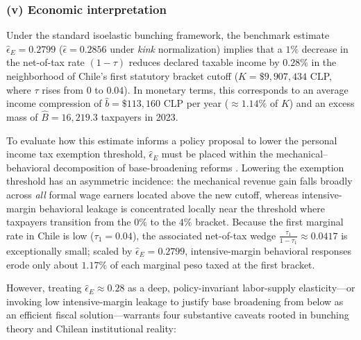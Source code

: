 \subsubsection*{(v) Economic interpretation}

Under the standard isoelastic bunching framework, the benchmark estimate $\hat{\epsilon}_E = 0.2799$ ($\hat{\epsilon} = 0.2856$ under \textit{kink} normalization) implies that a $1\%$ decrease in the net-of-tax rate $(1-\tau)$ reduces declared taxable income by $0.28\%$ in the neighborhood of Chile's first statutory bracket cutoff ($K = \$9{,}907{,}434$ CLP, where $\tau$ rises from $0$ to $0.04$). In monetary terms, this corresponds to an average income compression of $\hat{b} = \$113{,}160$ CLP per year ($\approx 1.14\%$ of $K$) and an excess mass of $\hat{B} = 16{,}219.3$ taxpayers in 2023.

To evaluate how this estimate informs a policy proposal to lower the personal income tax exemption threshold, $\hat{\epsilon}_E$ must be placed within the mechanical--behavioral decomposition of base-broadening reforms \parencite{gutierrezNoExemption}. Lowering the exemption threshold has an asymmetric incidence: the mechanical revenue gain falls broadly across \emph{all} formal wage earners located above the new cutoff, whereas intensive-margin behavioral leakage is concentrated locally near the threshold where taxpayers transition from the $0\%$ to the $4\%$ bracket. Because the first marginal rate in Chile is low ($\tau_1 = 0.04$), the associated net-of-tax wedge $\frac{\tau_1}{1-\tau_1} \approx 0.0417$ is exceptionally small; scaled by $\hat{\epsilon}_E = 0.2799$, intensive-margin behavioral responses erode only about $1.17\%$ of each marginal peso taxed at the first bracket.

However, treating $\hat{\epsilon}_E \approx 0.28$ as a deep, policy-invariant labor-supply elasticity---or invoking low intensive-margin leakage to justify base broadening from below as an efficient fiscal solution---warrants four substantive caveats rooted in bunching theory and Chilean institutional reality:

